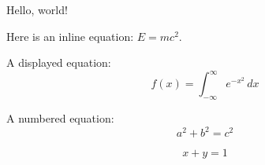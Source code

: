 \documentclass{article}
\begin{document}
Hello, world!

Here is an inline equation\cite{ruby}: $E = mc^2$.

A displayed equation:
\[
f(x) = \int_{-\infty}^{\infty} e^{-x^2} \, dx
\]

A numbered equation:
\begin{equation}
a^2 + b^2 = c^2
\end{equation}

$$ x + y = 1$$


\end{document}
